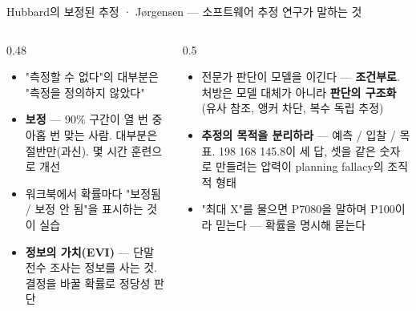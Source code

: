 \begin{frame}{Hubbard의 보정된 추정 · Jørgensen — 소프트웨어 추정 연구가 말하는 것}
\begin{columns}[T]
\begin{column}{0.48\textwidth}
\begin{itemize}
\item "측정할 수 없다"의 대부분은 "측정을 정의하지 않았다"
\item \textbf{보정} — 90\% 구간이 열 번 중 아홉 번 맞는 사람. 대부분은 절반만(과신). 몇 시간 훈련으로 개선
\item 워크북에서 확률마다 "보정됨 / 보정 안 됨"을 표시하는 것이 실습
\item \textbf{정보의 가치(EVI)} — 단말 전수 조사는 정보를 사는 것. 결정을 바꿀 확률로 정당성 판단
\end{itemize}
\end{column}
\begin{column}{0.5\textwidth}
\begin{itemize}
\item 전문가 판단이 모델을 이긴다 — \textbf{조건부로}. 처방은 모델 대체가 아니라 \textbf{판단의 구조화}(유사 참조, 앵커 차단, 복수 독립 추정)
\item \textbf{추정의 목적을 분리하라} — 예측 / 입찰 / 목표. 198 \ra{} 168 \ra{} 145.8이 세 답, 셋을 같은 숫자로 만들려는 압력이 planning fallacy의 조직적 형태
\item "최대 X"를 물으면 P70\til{}80을 말하며 P100이라 믿는다 — 확률을 명시해 묻는다
\end{itemize}
\end{column}
\end{columns}
\end{frame}

